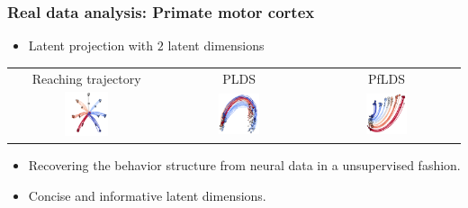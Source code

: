 \documentclass[16pt,presentation]{beamer}
\begin{document}
\begin{frame}
\frametitle{Real data analysis: Primate motor cortex}
\begin{itemize}
\item Latent projection with $2$ latent dimensions
\end{itemize}
\begin{tabular}{ ccc } 
{\small Reaching trajectory} & {\small PLDS} & {\small PfLDS} \\
\includegraphics[width = 0.30\textwidth]{./figs/flds/fig_GeorgeMove_trajectory.pdf}&
\includegraphics[width = 0.30\textwidth]{./figs/flds/fig_GeorgeMove_2dvisual_mat_PLDS.pdf}&
\includegraphics[width = 0.30\textwidth]{./figs/flds/fig_GeorgeMove_2dvisual_py_PLDS.pdf}
\end{tabular}
\begin{itemize}
\item Recovering the behavior structure from neural data in a \alert{unsupervised} fashion.
\item \alert{Concise} and \alert{informative} latent dimensions.
\end{itemize}
\end{frame}
\end{document}
